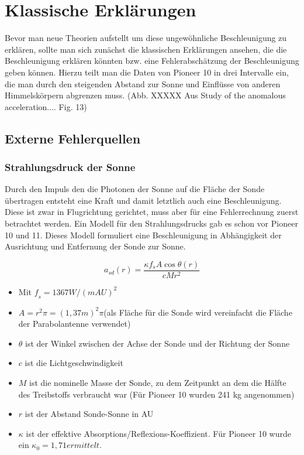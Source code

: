 \section{Klassische Erkl\"arungen}

Bevor man neue Theorien aufstellt um diese ungew\"ohnliche
Beschleunigung zu erkl\"aren, sollte man sich zun\"achst die
klassischen Erkl\"arungen ansehen, die die Beschleunigung erkl\"aren
k\"onnten bzw. eine Fehlerabsch\"atzung der Beschleunigung geben
k\"onnen. Hierzu teilt man die Daten von Pioneer 10 in drei Intervalle
ein, die man durch den steigenden Abstand zur Sonne und Einfl\"usse von
anderen Himmelsk\"orpern abgrenzen muss. (Abb. XXXXX Aus Study of the
anomalous acceleration.... Fig. 13)

\subsection{Externe Fehlerquellen}

\subsubsection{Strahlungsdruck der Sonne}

Durch den Impuls den die Photonen der Sonne auf die Fl\"ache der Sonde
\"ubertragen entsteht eine Kraft und damit letztlich auch eine
Beschleunigung. Diese ist zwar in Flugrichtung gerichtet, muss aber
f\"ur eine Fehlerrechnung zuerst betrachtet werden. Ein Modell f\"ur
den Strahlungsdrucks gab es schon vor Pioneer 10 und 11. Dieses Modell
formuliert eine Beschleunigung in Abh\"angigkeit der Ausrichtung und
Entfernung der Sonde zur Sonne. 

\begin{equation}\label{eins}
a_{\mathit{sd}}(r)=\frac{\kappa f_{s}A\cos \theta
(r)}{cMr^{2}}
\end{equation}

\begin{itemize}
\item Mit  $\mathit{f_s}=1367W/(\mathit{mAU})^2$
\item $A=r^2\pi =(1,37m)^2\pi $(als Fl\"ache f\"ur die Sonde wird vereinfacht
die Fl\"ache der Parabolantenne verwendet)
\item  $\theta $ ist der Winkel zwischen der Achse der Sonde und der Richtung
der Sonne
\item $c$ ist die Lichtgeschwindigkeit
\item $M$ ist die nominelle Masse der Sonde, zu dem Zeitpunkt an dem die H\"alfte des
Treibstoffs verbraucht war (F\"ur Pioneer 10 wurden 241 kg angenommen)
\item $r$ ist der Abstand Sonde-Sonne in AU
\item $\kappa $ ist der effektive Absorptions/Reflexions-Koeffizient. F\"ur
Pioneer 10 wurde ein $\kappa_0=1,71 ermittelt$\cite{Anderson2002}.
\end{itemize}

